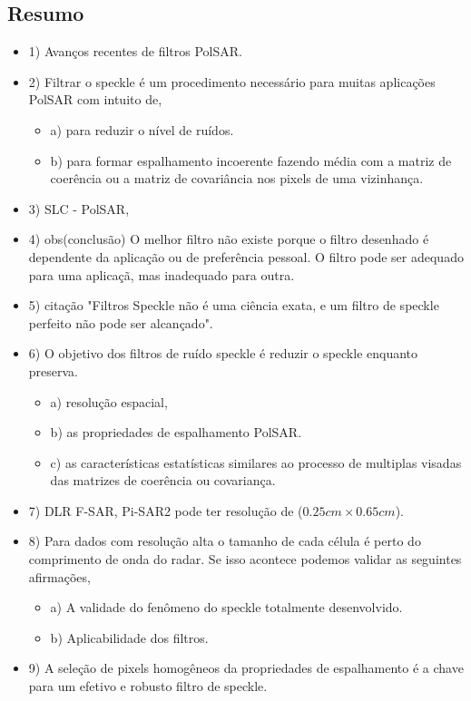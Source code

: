 \documentclass{article}
\begin{document}
\subsection{Resumo}
\begin{itemize}
\item 1) Avanços recentes de filtros PolSAR.
\item 2) Filtrar o speckle é um procedimento necessário para muitas aplicações PolSAR com intuito de,
	\begin{itemize}	
	\item a)  para reduzir o nível de ruídos.
	\item b)  para formar espalhamento incoerente fazendo média com a matriz de coerência ou a matriz de covariância nos pixels de uma vizinhança.
	\end{itemize}
\item 3) SLC - PolSAR,
\item 4) obs(conclusão) O melhor filtro não existe porque o filtro desenhado é dependente da aplicação ou de preferência pessoal. O filtro pode ser adequado para uma aplicaçã, mas inadequado para outra.
\item 5) citação "Filtros Speckle não é uma ciência exata, e um filtro de speckle perfeito não pode ser alcançado".
\item 6) O objetivo dos filtros de ruído speckle é reduzir o speckle enquanto preserva.
\begin{itemize}
\item a) resolução espacial,
\item b) as propriedades de espalhamento PolSAR.
\item c) as características estatísticas similares ao processo de multiplas visadas das matrizes de coerência ou covariança.
\end{itemize}
\item 7) DLR F-SAR, Pi-SAR2 pode ter resolução de ($0.25 cm\times 0.65 cm$).
\item 8) Para dados com resolução alta o tamanho de cada célula é perto do comprimento de onda do radar. Se isso acontece podemos validar as seguintes afirmações,
\begin{itemize}
\item a) A validade do fenômeno do speckle totalmente desenvolvido.
\item b) Aplicabilidade dos filtros. 
\end{itemize} 
\item 9) A seleção de pixels homogêneos da propriedades de espalhamento é a chave para um efetivo e robusto filtro de speckle.
\end{itemize}
\end{document}
